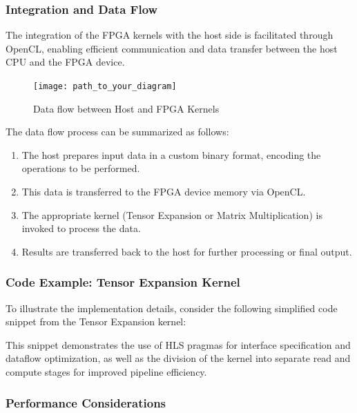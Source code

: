 \documentclass[12pt,oneside,a4paper]{article}
\begin{document}
\subsubsection{Integration and Data Flow}
The integration of the FPGA kernels with the host side is facilitated through OpenCL, enabling efficient communication and data transfer between the host CPU and the FPGA device.

\begin{figure}[h]
    \centering
    \texttt{[image: path\_to\_your\_diagram]}
    \caption{Data flow between Host and FPGA Kernels}
    \label{fig:dataflow}
\end{figure}

The data flow process can be summarized as follows:

\begin{enumerate}
    \item The host prepares input data in a custom binary format, encoding the operations to be performed.
    \item This data is transferred to the FPGA device memory via OpenCL.
    \item The appropriate kernel (Tensor Expansion or Matrix Multiplication) is invoked to process the data.
    \item Results are transferred back to the host for further processing or final output.
\end{enumerate}

\subsubsection{Code Example: Tensor Expansion Kernel}

To illustrate the implementation details, consider the following simplified code snippet from the Tensor Expansion kernel:

This snippet demonstrates the use of HLS pragmas for interface specification and dataflow optimization, as well as the division of the kernel into separate read and compute stages for improved pipeline efficiency.

\subsubsection{Performance Considerations}
\end{document}
